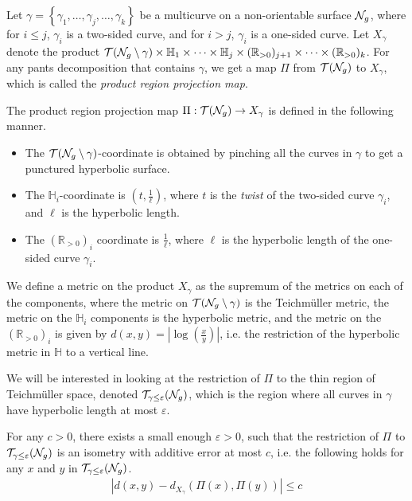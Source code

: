 \documentclass[12pt, reqno]{amsart}
\begin{document}
Let $\gamma = \left\{ \gamma_1, \ldots, \gamma_j, \ldots, \gamma_k \right\}$ be a multicurve on a non-orientable surface $\mathcal{N}_g$, where for $i \leq j$, $\gamma_i$ is a two-sided curve, and for $i > j$, $\gamma_i$ is a one-sided curve.
Let $X_\gamma$ denote the product $\mathcal{T}(\mathcal{N}_g \setminus \gamma) \times \mathbb{H}_1 \times \cdots \times \mathbb{H}_j \times (\mathbb{R}_{>0})_{j+1} \times \cdots \times (\mathbb{R}_{>0})_k$.
For any pants decomposition that contains $\gamma$, we get a map $\Pi$ from $\mathcal{T}(\mathcal{N}_g)$ to $X_\gamma$, which is called the \emph{product region projection map}.
\begin{definition}
  The product region projection map $\Pi: \mathcal{T}(\mathcal{N}_g) \to X_\gamma$ is defined in the following manner.
  \begin{itemize}
  \item The $\mathcal{T}(\mathcal{N}_g \setminus \gamma)$-coordinate is obtained by pinching all the curves in $\gamma$ to get a punctured hyperbolic surface.
  \item The $\mathbb{H}_i$-coordinate is $\left( t, \frac{1}{\ell} \right)$, where $t$ is the \emph{twist} of the two-sided curve $\gamma_i$, and $\ell$ is the hyperbolic length.
  \item The $(\mathbb{R}_{>0})_i$ coordinate is $\frac{1}{\ell}$, where $\ell$ is the hyperbolic length of the one-sided curve $\gamma_i$.
  \end{itemize}
\end{definition}

We define a metric on the product $X_\gamma$ as the supremum of the metrics on each of the components, where the metric on $\mathcal{T}(\mathcal{N}_g \setminus \gamma)$ is the Teichmüller metric, the metric on the $\mathbb{H}_i$ components is the hyperbolic metric, and the metric on the $(\mathbb{R}_{>0})_i$ is given by $d(x,y) = \left| \log\left( \frac{x}{y}  \right) \right| $, i.e. the restriction of the hyperbolic metric in $\mathbb{H}$ to a vertical line.

We will be interested in looking at the restriction of $\Pi$ to the thin region of Teichmüller space, denoted $\mathcal{T}_{\gamma \leq \varepsilon}(\mathcal{N}_g)$, which is the region where all curves in $\gamma$ have hyperbolic length at most $\varepsilon$.

\begin{theorem}
  \label{thm:prno}
  For any $c >0$, there exists a small enough $\varepsilon > 0$, such that the restriction of $\Pi$ to $\mathcal{T}_{\gamma \leq \varepsilon}(\mathcal{N}_g)$ is an isometry with additive error at most $c$, i.e. the following holds for any $x$ and $y$ in $\mathcal{T}_{\gamma \leq \varepsilon}(\mathcal{N}_g)$.
  \begin{align*}
    \left| d(x, y) - d_{X_{\gamma}}(\Pi(x), \Pi(y)) \right| \leq c
  \end{align*}
\end{theorem}
\end{document}
